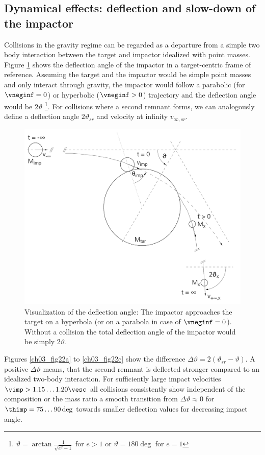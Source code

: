 \subsection{Dynamical effects: deflection and slow-down of the impactor}
Collisions in the gravity regime can be regarded as a departure from a simple two body interaction between the target and impactor idealized with point masses. Figure \ref{ch03_fig04} shows the deflection angle of the impactor in a target-centric frame of reference. Assuming the target and the impactor would be simple point masses and only interact through gravity, the impactor would follow a parabolic (for $\vneginf = 0$) or hyperbolic ($\vneginf > 0$) trajectory and the deflection angle would be $2 \vartheta$ \footnote{$\vartheta = \arctan{\frac{1}{\sqrt{ e^2 - 1}}}$ for $e > 1$ or $\vartheta = 180 \deg$ for $e = 1$}. For collisions where a second remnant forms, we can analogously define a deflection angle $2 \vartheta_{sr}$ and velocity at infinity $v_{\infty, sr}$.
\begin{figure}
\begin{center}
\includegraphics[scale=0.5]{04_vartheta}
\caption{Visualization of the deflection angle: The impactor approaches the target on a hyperbola (or on a parabola in case of $\vneginf = 0$). Without a collision the total deflection angle of the impactor would be simply $2 \vartheta$.}
\label{ch03_fig04}
\end{center}
\end{figure}
Figures \ref{ch03_fig22a} to \ref{ch03_fig22c} show the difference $\Delta \vartheta = 2 ( \vartheta_{sr} - \vartheta)$. A positive $\Delta \vartheta$ means, that the second remnant is deflected stronger compared to an idealized two-body interaction. For sufficiently large impact velocities $\vimp > 1.15 \dots 1.20 \vesc$ all collisions consistently show independent of the composition or the mass ratio a smooth transition from $\Delta \vartheta \approx 0$ for $\thimp = 75 \dots 90 \deg$ towards smaller deflection values for decreasing impact angle. 
